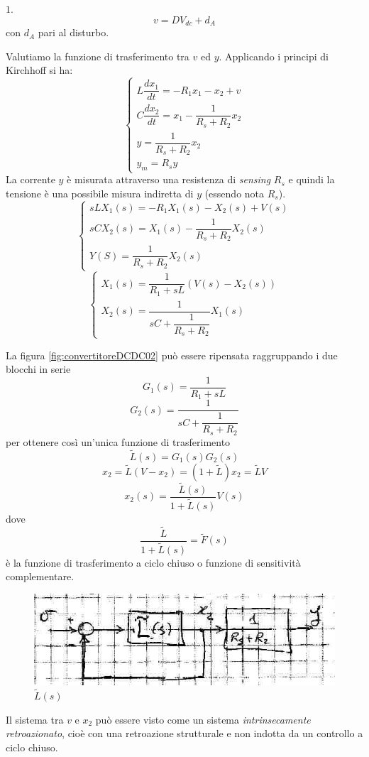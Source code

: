 \documentclass[a4paper]{report}
\begin{document}
$1$. 
\[
v = D V_{dc} + d_A
\]
con $d_A$ pari al disturbo.

Valutiamo la funzione di trasferimento tra $v$ ed $y$. Applicando i
principi di Kirchhoff si ha:
\[
\left\{
\begin{array}{l}
  L \dfrac{dx_1}{dt} = - R_1 x_1 - x_2 + v\\
  C \dfrac{dx_2}{dt} = x_1 - \dfrac{1}{R_s + R_2}x_2\\
  y = \dfrac{1}{R_s + R_2}x_2\\
  y_m = R_s y
\end{array}
\right .
\]
La corrente $y$ \`e misurata attraverso una resistenza di {\em
  sensing} $R_s$ e quindi la tensione \`e una possibile misura
indiretta di $y$ (essendo nota $R_s$).
\[
\left\{
\begin{array}{l}
  sLX_1(s) = -R_1 X_1(s) - X_2(s) + V(s)\\
  sCX_2(s) = X_1(s) - \dfrac{1}{R_s + R_2}X_2(s)\\
  Y(S) = \dfrac{1}{R_s + R_2}X_2(s)
\end{array}
\right .
\]
\[
\left\{
\begin{array}{l}
 X_1(s) = \dfrac{1}{R_1 + sL} (V(s) - X_2(s))\\
 X_2(s) = \dfrac{1}{sC + \dfrac{1}{R_s + R_2}} X_1(s)
\end{array}
\right .
\]

La figura \ref{fig:convertitoreDCDC02} pu\`o essere ripensata
raggruppando i due blocchi in serie
\[
G_1(s) = \dfrac{1}{R_1 + sL}
\]
\[
G_2(s) = \dfrac{1}{sC + \dfrac{1}{R_s + R_2}}
\]
per ottenere cos\`i un'unica funzione di trasferimento
\[
\tilde{L}(s) = G_1(s) G_2(s)
\]
\[
x_2 = \tilde{L}(V - x_2) = (1 + \tilde{L}) x_2 = \tilde{L}V
\]
\[
x_2(s) = \dfrac{\tilde{L}(s)}{1 + \tilde{L}(s)} V(s)
\]
dove
\[
\dfrac{\tilde{L}}{1 + \tilde{L}(s)} = \tilde{F}(s)
\]
\`e la funzione di trasferimento a ciclo chiuso o funzione di
sensitivit\`a complementare.
\begin{figure}[!h]
  \begin{center}
    \includegraphics[scale=0.4]{./images/convertitore-dcdc04}
    \caption{$\tilde{L}(s)$}\label{fig:convertitore-dcdc04} 
  \end{center}
\end{figure}
Il sistema tra $v$ e $x_2$ pu\`o essere visto come un sistema {\em
  intrinsecamente retroazionato}, cio\`e con una retroazione
strutturale e non indotta da un controllo a ciclo chiuso.
\end{document}
